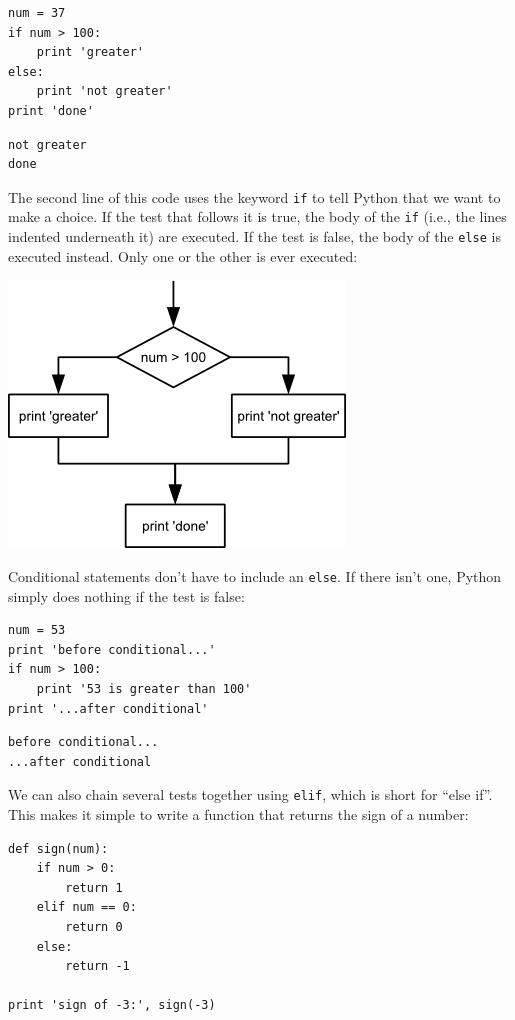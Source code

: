 \documentclass{book}
\begin{document}
\begin{verbatim}
num = 37
if num > 100:
    print 'greater'
else:
    print 'not greater'
print 'done'
\end{verbatim}

\begin{verbatim}
not greater
done
\end{verbatim}

The second line of this code uses the keyword \texttt{if} to tell Python
that we want to make a choice. If the test that follows it is true, the
body of the \texttt{if} (i.e., the lines indented underneath it) are
executed. If the test is false, the body of the \texttt{else} is
executed instead. Only one or the other is ever executed:

\includegraphics{novice/python/img/python-flowchart-conditional.png}

Conditional statements don't have to include an \texttt{else}. If there
isn't one, Python simply does nothing if the test is false:

\begin{verbatim}
num = 53
print 'before conditional...'
if num > 100:
    print '53 is greater than 100'
print '...after conditional'
\end{verbatim}

\begin{verbatim}
before conditional...
...after conditional
\end{verbatim}

We can also chain several tests together using \texttt{elif}, which is
short for ``else if''. This makes it simple to write a function that
returns the sign of a number:

\begin{verbatim}
def sign(num):
    if num > 0:
        return 1
    elif num == 0:
        return 0
    else:
        return -1

print 'sign of -3:', sign(-3)
\end{verbatim}
\end{document}
